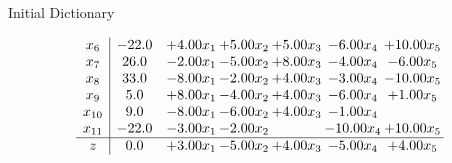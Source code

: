 \documentclass[8pt]{article}
\begin{document}
Initial Dictionary 

\[\begin{array}{c| c c@{\hskip 2pt} c@{\hskip 2pt} c@{\hskip 2pt} c@{\hskip 2pt} c@{\hskip 2pt} }
 x_{6}   &  -22.0 & +  4.00 x_{1} & +  5.00 x_{2} & +  5.00 x_{3} & -6.00 x_{4} & + 10.00 x_{5}\\
 x_{7}   &  26.0 & -2.00 x_{1} & -5.00 x_{2} & +  8.00 x_{3} & -4.00 x_{4} & -6.00 x_{5}\\
 x_{8}   &  33.0 & -8.00 x_{1} & -2.00 x_{2} & +  4.00 x_{3} & -3.00 x_{4} & -10.00 x_{5}\\
 x_{9}   &  5.0 & +  8.00 x_{1} & -4.00 x_{2} & +  4.00 x_{3} & -6.00 x_{4} & +  1.00 x_{5}\\
 x_{10}   &  9.0 & -8.00 x_{1} & -6.00 x_{2} & +  4.00 x_{3} & -1.00 x_{4} &   \\
 x_{11}   &  -22.0 & -3.00 x_{1} & -2.00 x_{2} &   & -10.00 x_{4} & + 10.00 x_{5}\\
\hline
z    &  0.0 & +  3.00 x_{1} & -5.00 x_{2} & +  4.00 x_{3} & -5.00 x_{4} & +  4.00 x_{5}\\
\end{array}\]
\end{document}
